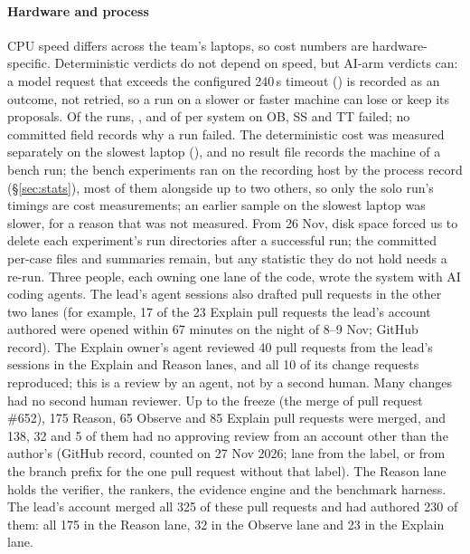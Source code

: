 \paragraph{Hardware and process}
CPU speed differs across the team's laptops, so cost numbers are hardware-specific.
Deterministic verdicts do not depend on speed, but AI-arm verdicts can: a model request that exceeds the configured 240\,s timeout () is recorded as an outcome, not retried, so a run on a slower or faster machine can lose or keep its proposals.
Of the  runs, ,  and  of  per system on OB, SS and TT failed; no committed field records why a run failed.
The deterministic cost was measured separately on the slowest laptop (), and no result file records the machine of a bench run; the bench experiments ran on the recording host by the process record (\S\ref{sec:stats}), most of them alongside up to two others, so only the solo run's timings are cost measurements; an earlier sample on the slowest laptop was slower, for a reason that was not measured.
From 26 Nov, disk space forced us to delete each experiment's run directories after a successful run; the committed per-case files and summaries remain, but any statistic they do not hold needs a re-run.
Three people, each owning one lane of the code, wrote the system with AI coding agents.
The lead's agent sessions also drafted pull requests in the other two lanes (for example, 17 of the 23 Explain pull requests the lead's account authored were opened within 67 minutes on the night of 8--9 Nov; GitHub record).
The Explain owner's agent reviewed 40 pull requests from the lead's sessions in the Explain and Reason lanes, and all 10 of its change requests reproduced; this is a review by an agent, not by a second human.
Many changes had no second human reviewer.
Up to the  freeze (the merge of pull request \#652), 175 Reason, 65 Observe and 85 Explain pull requests were merged, and 138, 32 and 5 of them had no approving review from an account other than the author's (GitHub record, counted on 27 Nov 2026; lane from the  label, or from the branch prefix for the one pull request without that label).
The Reason lane holds the verifier, the rankers, the evidence engine and the benchmark harness.
The lead's account merged all 325 of these pull requests and had authored 230 of them: all 175 in the Reason lane, 32 in the Observe lane and 23 in the Explain lane.

